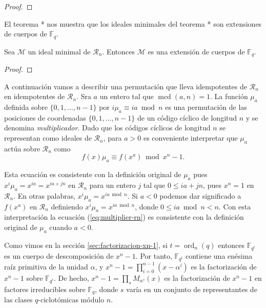 \begin{proof}
  
\end{proof}

El teorema * nos muestra que los ideales minimales del teorema * son extensiones de cuerpos de \(\mathbb F_q\).

\begin{theorem}
  Sea \(\mathcal M\) un ideal minimal de \(\mathcal R_n\).
  Entonces \(\mathcal M\) es una extensión de cuerpos de \(\mathbb F_q\).
\end{theorem}

\begin{proof}
  
\end{proof}

A continuación vamos a describir una permutación que lleva idempotentes de \(\mathcal R_n\) en idempotentes de \(\mathcal R_n\).
Sra \(a\) un entero tal que \(\operatorname{mcd}(a, n) = 1\).
La función \(\mu_a\) definida sobre \(\{0, 1, \dots, n -1\}\) por \(i\mu_a \equiv ia \bmod n\) es una permutación de las posiciones de coordenadas \(\{0, 1, \dots, n - 1\}\) de un código cíclico de longitud \(n\) y se denomina \textit{multiplicador}.
Dado que los códigos cíclicos de longitud \(n\) se representan como ideales de \(\mathcal R_n\), para \(a > 0\) es conveniente interpretar que \(\mu_a\) actúa sobre \(\mathcal R_n\) como
\begin{equation}
  \label{eq:multiplier-rn}
  f(x)\mu_a \equiv f(x^a) \bmod x^n - 1.
\end{equation}

Esta ecuación es consistente con la definición original de \(\mu_a\) pues \(x^i\mu_a = x^{ia} = x^{ia + jn}\) en \(\mathcal R_n\) para un entero \(j\) tal que \(0 \leq ia + jn\), pues \(x^n = 1\) en \(\mathcal R_n\).
En otras palabras, \(x^i\mu_a = x^{ia \bmod n}\).
Si \(a < 0\) podemos dar significado a \(f(x^a)\) en \(\mathcal R_n\) definiendo \(x^{i}\mu_a = x^{ia \bmod n}\), donde \(0 \leq ia \bmod n < n\).
Con esta interpretación la ecuación (\ref{eq:multiplier-rn}) es consistente con la definición original de \(\mu_a\) cuando \(a < 0\).


Como vimos en la sección \ref{sec:factorizacion-xn-1}, si \(t = \operatorname{ord}_n(q)\) entonces \(\mathbb F_{q^t}\) es un cuerpo de descomposición de \(x^n - 1\).
Por tanto, \(\mathbb F_{q^t}\) contiene una enésima raíz primitiva de la unidad \(\alpha\), y \(x^n - 1 = \prod_{i=0}^{n-1}(x - \alpha^{i})\) es la factorización de \(x^n - 1\) sobre \(\mathbb F_{q^t}\).
De hecho, \(x^n - 1 = \prod_s M_{\alpha^s}(x)\) es la factorización de \(x^n - 1\) en factores irreducibles sobre \(\mathbb F_q\), donde \(s\) varía en un conjunto de representantes de las clases \(q\)-ciclotómicas módulo \(n\).

